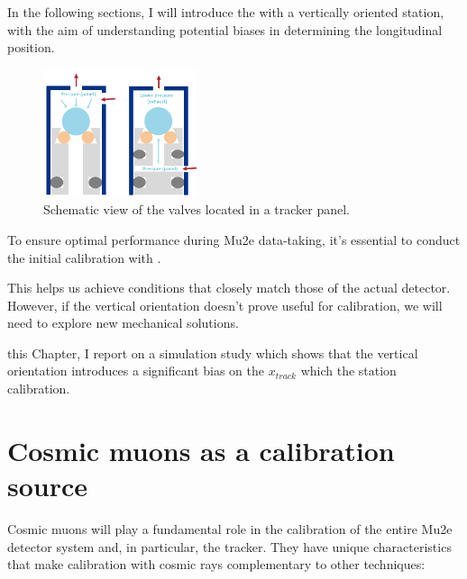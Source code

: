 
In the following 
sections, I will 
introduce the 
%
with a vertically oriented station, with the aim of understanding 
potential biases in determining the longitudinal position.

\begin{figure}[!h]
    \centering
    \includegraphics[width =0.4\textwidth]{figures/png/gassystem.png}
    \caption[Schematic view of the valves located in a tracker panel.]{Schematic view of the valves located in a tracker panel.}
    \label{fig:gassystem}
\end{figure}
To ensure optimal performance during Mu2e data-taking, it's essential to 
conduct the initial calibration with .

This helps us achieve conditions that closely 
match those of the actual detector. However, if the vertical 
orientation doesn't prove useful for calibration, 
we will need to explore new mechanical solutions.

 this Chapter, I  report on a simulation study 
which shows that the vertical orientation introduces a significant bias on 
the $x_{track}$ which 
the station calibration. 



\section{Cosmic muons as a calibration source}
Cosmic muons will play a fundamental role in the 
calibration of the entire Mu2e detector system and, 
in particular, the tracker. They have unique 
characteristics that make calibration with cosmic rays 
complementary to other techniques:

